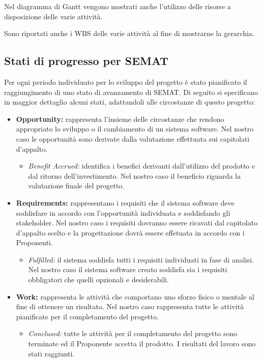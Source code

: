 \noindent Nel diagramma di \gls{Gantt} vengono mostrati anche l'utilizzo delle risorse a disposizione delle varie attività.

\noindent Sono riportati anche i \gls{WBS} delle varie attività al fine di mostrarne la gerarchia.

\subsection{Stati di progresso per SEMAT}
Per ogni periodo individuato per lo sviluppo del progetto \PROGETTO{} è stato pianificato il raggiungimento di uno stato di avanzamento di \gls{SEMAT}. Di seguito si specificano in maggior dettaglio alcuni stati, adattandoli alle circostanze di questo progetto:
\begin{itemize}
	\item \textbf{Opportunity:} rappresenta l'insieme delle circostanze che rendono appropriato lo sviluppo o il cambiamento di un sistema software. Nel nostro caso le opportunità sono derivate dalla valutazione effettuata sui capitolati d'appalto.
	\begin{itemize}
		\item \textit{Benefit Accrued:} identifica i benefici derivanti dall'utilizzo del prodotto e dal ritorno dell'investimento. Nel nostro caso il beneficio riguarda la valutazione finale del progetto.
	\end{itemize}
	\item \textbf{Requirements:} rappresentano i requisiti che il sistema software deve soddisfare in accordo con l'opportunità individuata e soddisfando gli stakeholder. Nel nostro caso i requisiti dovranno essere ricavati dal capitolato d'appalto scelto e la progettazione dovrà essere effetuata in accordo con i Proponenti.
	\begin{itemize}
		\item \textit{Fulfilled:} il sistema soddisfa tutti i requisiti individuati in fase di analisi. Nel nostro caso il sistema software creato soddisfa sia i requisiti obbligatori che quelli opzionali e desiderabili.
	\end{itemize}
	\item \textbf{Work:} rappresenta le attività che comportano uno sforzo fisico o mentale al fine di ottenere un risultato. Nel nostro caso rappresenta tutte le attività pianificate per il completamento del progetto.
	\begin{itemize}
		\item \textit{Conclused:} tutte le attività per il completamento del progetto sono terminate ed il Proponente accetta il prodotto. I risultati del lavoro sono stati raggiunti.
	\end{itemize}
\end{itemize}

